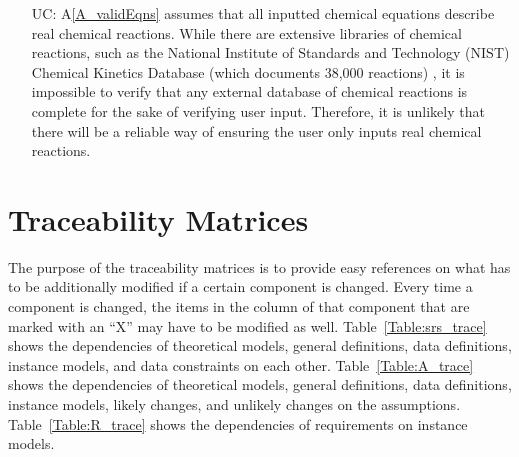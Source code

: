 \documentclass[12pt]{article}
\newcommand{\aref}[1]{A\ref{#1}}
\newcounter{ucnum} %
\begin{document}
\begin{itemize}
  \item[UC\refstepcounter{ucnum}\theucnum\label{UC_checkValidEqns}:]
    \aref{A_validEqns} assumes that all inputted chemical equations describe
    real chemical reactions. While there are extensive libraries of chemical
    reactions, such as the National Institute of Standards and Technology
    (NIST) Chemical Kinetics Database (which documents 38,000 reactions)
    \cite{national_institute_of_standards_and_technology_nist_2023}, it is
    impossible to verify that any external database of chemical reactions is
    complete for the sake of verifying user input. Therefore, it is unlikely
    that there will be a reliable way of ensuring the user only inputs real
    chemical reactions.

\end{itemize}

\newpage

\section{Traceability Matrices} \label{sec_traceMats}

The purpose of the traceability matrices is to provide easy references on what
has to be additionally modified if a certain component is changed.  Every time a
component is changed, the items in the column of that component that are marked
with an ``X'' may have to be modified as well. Table~\ref{Table:srs_trace} shows
the dependencies of theoretical models, general definitions, data definitions,
instance models, and data constraints on each other. Table~\ref{Table:A_trace}
shows the dependencies of theoretical models,
general definitions, data definitions, instance models, likely changes, and
unlikely changes on the assumptions. Table~\ref{Table:R_trace}
shows the dependencies of requirements on instance models.
\end{document}
